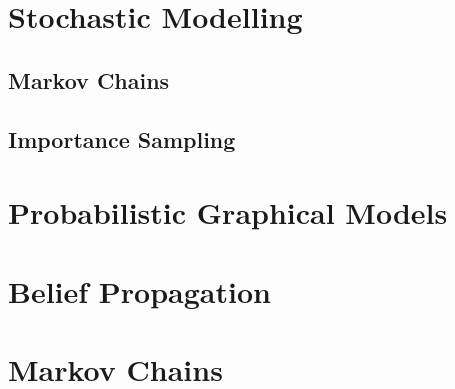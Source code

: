 \section{Stochastic Modelling}

\subsection{Markov Chains}

\subsection{Importance Sampling}\label{sec:theory_importance_sampling}

\section{Probabilistic Graphical Models}

\section{Belief Propagation}

\section{Markov Chains}

